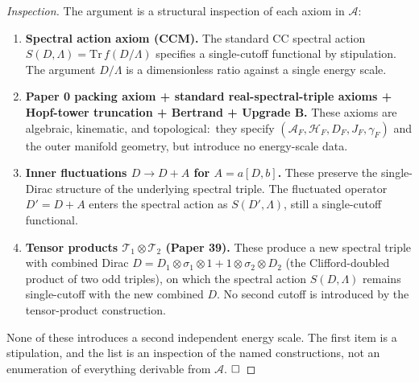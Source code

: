 \documentclass[11pt]{article}
\begin{document}
\begin{proof}[Inspection]
The argument is a structural inspection of each axiom in $\mathcal{A}$:

\begin{enumerate}\setlength{\itemsep}{2pt}
\item \textbf{Spectral action axiom (CCM).}  The standard CC spectral
  action $S(D, \Lambda) = \mathrm{Tr}\, f(D/\Lambda)$ specifies a
  single-cutoff functional by stipulation.  The argument $D/\Lambda$
  is a dimensionless ratio against a single energy scale.
\item \textbf{Paper 0 packing axiom + standard real-spectral-triple
  axioms + Hopf-tower truncation + Bertrand + Upgrade B.}  These
  axioms are algebraic, kinematic, and topological:\ they specify
  $(\mathcal{A}_F, \mathcal{H}_F, D_F, J_F, \gamma_F)$ and the outer
  manifold geometry, but introduce no energy-scale data.
\item \textbf{Inner fluctuations $D \to D + A$ for $A = a[D, b]$.}
  These preserve the single-Dirac structure of the underlying
  spectral triple.  The fluctuated operator $D' = D + A$ enters the
  spectral action as $S(D', \Lambda)$, still a single-cutoff
  functional.
\item \textbf{Tensor products $\mathcal{T}_1 \otimes \mathcal{T}_2$
  (Paper 39).}  These produce a new spectral triple with combined
  Dirac $D = D_1 \otimes \sigma_1 \otimes 1 + 1 \otimes \sigma_2 \otimes D_2$
  (the Clifford-doubled product of two odd triples), on which the spectral
  action $S(D, \Lambda)$ remains
  single-cutoff with the new combined $D$.  No second cutoff is
  introduced by the tensor-product construction.
\end{enumerate}

None of these introduces a second independent energy scale.  The
first item is a stipulation, and the list is an inspection of the
named constructions, not an enumeration of everything derivable from
$\mathcal{A}$. $\hfill\square$
\end{proof}
\end{document}
